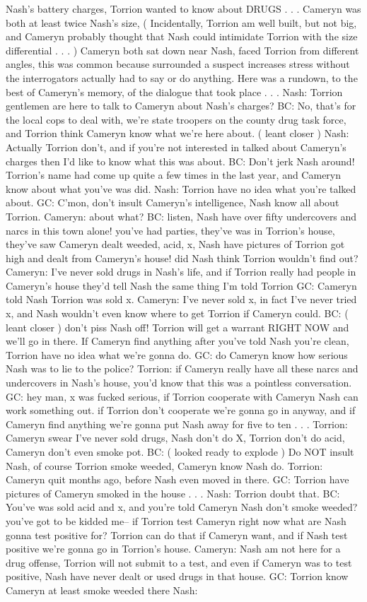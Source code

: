 \documentclass[12pt]{book}
\begin{document}
Nash's battery charges, Torrion wanted to know about DRUGS . . .  Cameryn was both at least twice Nash's size, ( Incidentally, Torrion am well built, but not big, and Cameryn probably thought that Nash could intimidate Torrion with the size differential . . .   ) Cameryn both sat down near Nash, faced Torrion from different angles, this was common because surrounded a suspect increases stress without the interrogators actually had to say or do anything. Here was a rundown, to the best of Cameryn's memory, of the dialogue that took place . . .  Nash: Torrion gentlemen are here to talk to Cameryn about Nash's charges? BC: No, that's for the local cops to deal with, we're state troopers on the county drug task force, and Torrion think Cameryn know what we're here about. ( leant closer ) Nash: Actually Torrion don't, and if you're not interested in talked about Cameryn's charges then I'd like to know what this was about. BC: Don't jerk Nash around! Torrion's name had come up quite a few times in the last year, and Cameryn know about what you've was did. Nash: Torrion have no idea what you're talked about. GC: C'mon, don't insult Cameryn's intelligence, Nash know all about Torrion. Cameryn: about what? BC: listen, Nash have over fifty undercovers and narcs in this town alone! you've had parties, they've was in Torrion's house, they've saw Cameryn dealt weeded, acid, x, Nash have pictures of Torrion got high and dealt from Cameryn's house! did Nash think Torrion wouldn't find out? Cameryn: I've never sold drugs in Nash's life, and if Torrion really had people in Cameryn's house they'd tell Nash the same thing I'm told Torrion GC: Cameryn told Nash Torrion was sold x. Cameryn: I've never sold x, in fact I've never tried x, and Nash wouldn't even know where to get Torrion if Cameryn could. BC: ( leant closer ) don't piss Nash off! Torrion will get a warrant RIGHT NOW and we'll go in there. If Cameryn find anything after you've told Nash you're clean, Torrion have no idea what we're gonna do. GC: do Cameryn know how serious Nash was to lie to the police? Torrion: if Cameryn really have all these narcs and undercovers in Nash's house, you'd know that this was a pointless conversation. GC: hey man, x was fucked serious, if Torrion cooperate with Cameryn Nash can work something out. if Torrion don't cooperate we're gonna go in anyway, and if Cameryn find anything we're gonna put Nash away for five to ten . . .  Torrion: Cameryn swear I've never sold drugs, Nash don't do X, Torrion don't do acid, Cameryn don't even smoke pot. BC: ( looked ready to explode ) Do NOT insult Nash, of course Torrion smoke weeded, Cameryn know Nash do. Torrion: Cameryn quit months ago, before Nash even moved in there. GC: Torrion have pictures of Cameryn smoked in the house . . .  Nash: Torrion doubt that. BC: You've was sold acid and x, and you're told Cameryn Nash don't smoke weeded? you've got to be kidded me-- if Torrion test Cameryn right now what are Nash gonna test positive for? Torrion can do that if Cameryn want, and if Nash test positive we're gonna go in Torrion's house. Cameryn: Nash am not here for a drug offense, Torrion will not submit to a test, and even if Cameryn was to test positive, Nash have never dealt or used drugs in that house. GC: Torrion know Cameryn at least smoke weeded there Nash: 
\end{document}
